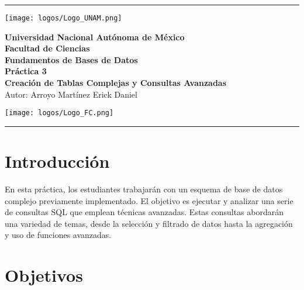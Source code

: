 

\thispagestyle{empty}
\rule{17cm}{0.1mm}
\begin{center}
    \begin{minipage}{3cm}
        \begin{center}
    	\texttt{[image: logos/Logo\_UNAM.png]}
        \end{center}
    \end{minipage}\hfill
    \begin{minipage}{10cm}
        \begin{center}
            \textbf{\large Universidad Nacional Autónoma de México}\\[0.1cm]
            \textbf{\large Facultad de Ciencias}\\[0.2cm]          
            \Large \textbf{Fundamentos de Bases de Datos}\\[0.2cm]
            \LARGE \textbf{Práctica 3}  \\[0.1cm]
            \Large \textbf{Creación de Tablas Complejas y Consultas Avanzadas}  \\[0.1cm]
            \vspace{0.2cm}
            \small 
                Autor: Arroyo Martínez Erick Daniel  \\[0.1cm] 
        \end{center}
    \end{minipage}\hfill
    \begin{minipage}{3cm}
        \begin{center}
            \texttt{[image: logos/Logo\_FC.png]}
        \end{center}
    \end{minipage}
\end{center}

\rule{17cm}{0.1mm}

\section*{Introducción}

En esta práctica, los estudiantes trabajarán con un esquema de base de datos complejo previamente implementado. El objetivo es ejecutar y analizar una serie de consultas SQL que emplean técnicas avanzadas. Estas consultas abordarán una variedad de temas, desde la selección y filtrado de datos hasta la agregación y uso de funciones avanzadas.

\section*{Objetivos}

